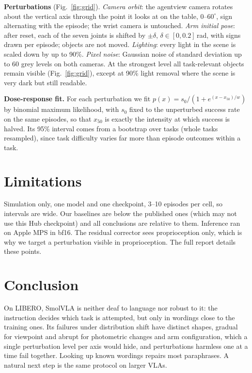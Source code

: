 \textbf{Perturbations} (Fig.~\ref{fig:grid}). \emph{Camera orbit}: the agentview camera rotates about the
vertical axis through the point it looks at on the table, $0$--$60^\circ$, sign alternating with the
episode; the wrist camera is untouched. \emph{Arm initial pose}: after reset, each of the seven joints
is shifted by $\pm\delta$, $\delta\in[0,0.2]$\,rad, with signs drawn per episode; objects are not moved.
\emph{Lighting}: every light in the scene is scaled down by up to 90\%. \emph{Pixel noise}: Gaussian noise
of standard deviation up to 60 grey levels on both cameras. At the strongest level all task-relevant
objects remain visible (Fig.~\ref{fig:grid}), except at 90\% light removal where the scene is very dark
but still readable.

\textbf{Dose-response fit.} For each perturbation we fit
$p(x) = s_0 / (1 + e^{(x - x_{50})/w})$ by binomial maximum likelihood, with $s_0$ fixed to the
unperturbed success rate on the same episodes, so that $x_{50}$ is exactly the intensity at which
success is halved. Its 95\% interval comes from a bootstrap over tasks (whole tasks resampled), since
task difficulty varies far more than episode outcomes within a task.



\section{Limitations}
Simulation only, one model and one checkpoint, 3--10 episodes per cell, so intervals are wide. Our baselines are
below the published ones (which may not use this Hub checkpoint) and all conclusions are relative to them.
Inference ran on Apple MPS in bf16. The residual corrector sees proprioception only, which is why we target a
perturbation visible in proprioception. The full report details these points.

\section{Conclusion}
On LIBERO, SmolVLA is neither deaf to language nor robust to it: the instruction decides which task is
attempted, but only in wordings close to the training ones. Its failures under distribution shift have
distinct shapes, gradual for viewpoint and abrupt for photometric changes and arm configuration,
which a single perturbation level per axis would hide, and perturbations harmless one at a time fail
together. Looking up known wordings repairs most paraphrases. \RLRandConclusion{} A natural next step is
the same protocol on larger VLAs.
